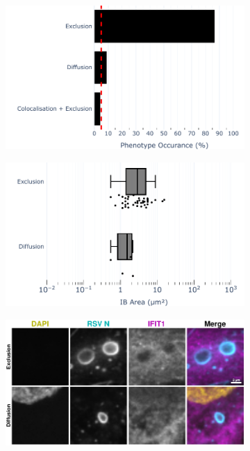 \begin{figure}
    \begin{subfigure}{0.495\textwidth}
        \caption{}
        \includegraphics[width=1\linewidth]{09. Chapter 4/Figs/02. Infection/01. IFIT1/04. bar_i1_beas2b.pdf} 
    \end{subfigure}
    \begin{subfigure}{0.495\textwidth}
        \caption{}
        \includegraphics[width=1\linewidth]{09. Chapter 4/Figs/02. Infection/01. IFIT1/05. box_i1_beas2b.pdf}
    \end{subfigure}
    \begin{subfigure}{1\textwidth}
        \centering
        \caption{}
        \includegraphics[width=1\linewidth]{09. Chapter 4/Figs/02. Infection/01. IFIT1/06. beas2b i1.pdf}

\end{subfigure}
\end{figure}
